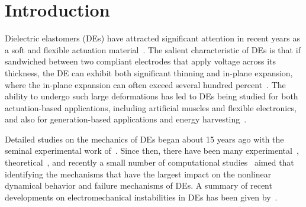 \documentclass[final,authoryear,3p,times]{elsarticle}
\begin{document}

\section{Introduction} 



Dielectric elastomers (DEs) have attracted significant attention in recent years as a soft and flexible actuation material~\citep{carpiSCIENCE2010,brochuMRC2010,biddissMEP2008}.  The salient characteristic of DEs is that if sandwiched between two compliant electrodes that apply voltage across its thickness, the DE can exhibit both significant thinning and in-plane expansion, where the in-plane expansion can often exceed several hundred percent~\citep{keplingerSM2012}.  The ability to undergo such large deformations has led to DEs being studied for both actuation-based applications, including artificial muscles and flexible electronics, and also for generation-based applications and energy harvesting~\citep{carpiSCIENCE2010,brochuMRC2010,mirMT2007}.

Detailed studies on the mechanics of DEs began about 15 years ago with the seminal experimental work of~\citet{pelrineSAA1998,pelrineSCIENCE2000}.  Since then, there have been many experimental~\citep{foxJMPS2008,keplingerPNAS2010,kofodJIMSS2003,kofodSAA2005,peiSPIE2004,planteIJSS2006,planteSAA2007,planteSMS2007,schlaakSPIE2005,wisslerSAA2007a,zhangSPIE2004,chibaSPIE2008,wangPRL2011a,wangAM2012,wangNC2012}, theoretical~\citep{suoJMPS2008,suoAMSS2010,goulbourneJAM2005,dorfmannAM2005,dorfmannJE2006,mcmeekingJAM2005,patrickSAA2007,planteSAA2007,planteSMS2007,wisslerSMS2005}, and recently a small number of computational studies~\citep{parkIJSS2012,parkSM2013,parkCMAME2013,zhouIJSS2008,zhaoAPL2007,vuIJNME2007,wisslerSMS2005,buschelIJNME2013,khanCM2013,henannJMPS2013,liSMS2012} aimed that identifying the mechanisms that have the largest impact on the nonlinear dynamical behavior and failure mechanisms of DEs.  A summary of recent developments on electromechanical instabilities in DEs has been given by~\citet{zhaoAPR2014}.  
\end{document}
